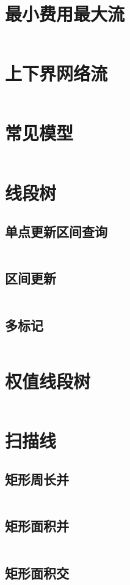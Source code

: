 \documentclass[a4paper,11pt]{article}
\begin{document}
\section*{最小费用最大流}
\inputminted[]{c++}{Template/NetworkFlow/mcmf.cpp}
\section*{上下界网络流}
\inputminted[]{c++}{Template/NetworkFlow/UpDownFlow.cpp}
\section*{常见模型}
\inputminted[]{c++}{Template/NetworkFlow/FlowModel.cpp}

\newpage
\section*{线段树}
\subsection*{单点更新区间查询}
\inputminted[]{c++}{Template/Segment/SegTreeI.cpp}
\subsection*{区间更新}
\inputminted[]{c++}{Template/Segment/SegTreeII.cpp}
\subsection*{多标记}
\inputminted[]{c++}{Template/Segment/SegTreeIII.cpp}

\section*{权值线段树}
\inputminted[]{c++}{Template/Segment/WeightSegTree.cpp}
\section*{扫描线}
\subsection*{矩形周长并}
\inputminted[]{c++}{Template/Segment/poj1177.cpp}
\subsection*{矩形面积并}
\inputminted[]{c++}{Template/Segment/hdu1542.cpp}
\subsection*{矩形面积交}
\inputminted[]{c++}{Template/Segment/hdu1255.cpp}
\end{document}
